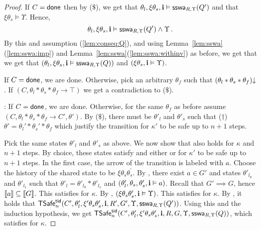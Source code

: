 \begin{proof}
If $C = \done$ then by ($\$$), 
we get that $\theta_l,\xi\theta_s,\intp \vDash \sswa{Q'}{R}{\Upsilon}$
and that $\xi\theta_s \vDash \Upsilon$.
Hence,
$$
\theta_l,\xi\theta_s,\intp \vDash \sswa{Q'}{R}{\Upsilon} \land \Upsilon\,.
$$
By this and assumption (\ref{lem:conseq:Q}), and using 
Lemma~\ref{lem:sswa}(\ref{lem:sswa:imp}) and Lemma~\ref{lem:sswa}(\ref{lem:sswa:withinv}) as before, we get that 
we get that 
$(\theta_l,\xi\theta_s,\intp \vDash   \sswa{Q}{R}{\Upsilon})$
and
$(\xi\theta_s,\intp \vDash   \Upsilon)$. 

If $C=\done$, we are done.
Otherwise, 
pick an arbitrary $\theta_f$ such that %
$\consistent{\theta_l*\theta_s*\theta_f}$.
If $(C,\theta_l*\theta_s*\theta_f \rightarrow \top)$   we get a contradiction to ($\$$).

: 
If $C=\done$, we are done.
Otherwise, 
for the same $\theta_f$ as before
assume $(C, \theta_l*\theta_s*\theta_f \rightarrow C',\theta')$. 
By ($\$$), 
there must be  $\theta'_l$  and $\theta'_s$ such that 
($\dag$) $\theta' = \theta_l' * \theta_s' * \theta_f$ 
which justify the transition for $\kappa'$ to be safe up to $n+1$ steps.

Pick the same   states $\theta'_l$  and $\theta'_s$  as above.
We now show that  also holds for $\kappa$ and $n+1$ steps. 
By choice, these states satisfy  and either  
 or  for $\kappa'$ to be safe up to $n+1$ steps.
In the first case, the arrow of the transition is labeled with $a$.
Choose the  history of the shared state to be  
$\xi\theta_s\theta^{'}_s$.
By , there exist $a \in G'$ and states $\theta'_{l_0}$ and $\theta'_{l_1}$
such that $\theta'_{l} = \theta'_{l_0} * \theta'_{l_1}$  and
$(\theta'_l,\theta_s,\theta_s',\intp \vDash a)$.
Recall that $G' \implies G$, hence $\db{a}\subseteq \db{G}$.
This satisfies  for $\kappa$. 
By , $(\xi\theta_s\theta_s',\intp \vDash \Upsilon)$.
This satisfies  for $\kappa$. 
By , it holds that 
$\safe_n(C',\theta'_l,\xi'\theta_s\theta_s',\intp,R',G',\Upsilon,\sswa{Q'}{R}{\Upsilon})$.
Using this and the induction hypothesis, we get
$\safe_n(C',\theta'_l,\xi'\theta_s\theta_s',\intp,R,G,\Upsilon,\sswa{Q}{R}{\Upsilon})$,
which satisfies   for $\kappa$.



\end{proof}
